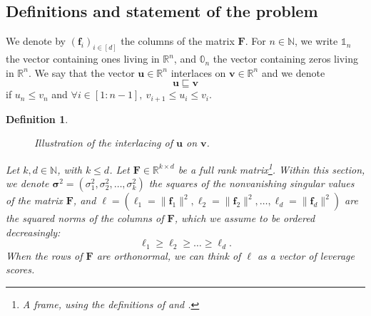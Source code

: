 \documentclass[twoside,11pt]{book}
\newtheorem{definition}{Definition}
\numberwithin{theorem}{chapter}
\numberwithin{definition}{chapter}
\numberwithin{proposition}{chapter}
\numberwithin{corollary}{chapter}
\numberwithin{example}{chapter}
\numberwithin{lemma}{chapter}
\numberwithin{assumption}{chapter}
\DeclareMathOperator{\Tran}{\intercal}
\begin{document}
\subsection{Definitions and statement of the problem}
 We denote by $(\bm{f}_{i})_{i \in [d]}$ the columns of the matrix $\bm{F}$. For $n \in \mathbb{N}$, we write $\mathbb{1}_{n}$ the vector containing ones living in $\mathbb{R}^{n}$, and $\mathbb{0}_{n}$ the vector containing zeros living in $\mathbb{R}^{n}$. We say that the vector $\bm{u} \in \mathbb{R}^{n}$ interlaces on $\bm{v} \in \mathbb{R}^{n}$ and we denote $$\bm{u} \sqsubseteq \bm{v}$$
if $u_{n} \leq v_{n}$ and $\forall i \in [1:n-1], \: v_{i+1} \leq u_{i} \leq v_{i}$.
\begin{definition}

\begin{figure}[!ht]
    \centering
    
    \caption{Illustration of the interlacing of $\bm{u}$ on $\bm{v}$.}
    \label{f:Interlacing_eigenvalues}
\end{figure}

Let $k, d \in \mathbb{N}$, with $k \leq d$. Let $\bm{F} \in \mathbb{R}^{k \times d}$ be a full rank matrix\footnote{A \emph{frame}, using the definitions of \citep{FiMiPo11} and \citep{FMPS13}.}.
Within this section, we denote $\bm{\sigma}^2 = (\sigma_{1}^2, \sigma_{2}^2, \dots ,\sigma_{k}^2)$ the squares of the nonvanishing singular values of the matrix $\bm{F}$, and $\bm{\ell} = (\ell_{1}=\|\bm{f}_{1}\|^{2}, \ell_{2}=\|\bm{f}_{2}\|^{2}, \dots, \ell_{d}=\|\bm{f}_{d}\|^{2})$ are the squared norms of the columns of $\bm{F}$, which we assume to be ordered decreasingly:
$$\ell_{1} \geq \ell_{2} \geq \dots \geq \ell_{d}.$$
 When the rows of $\bm{F}$ are orthonormal, we can think of $\bm{\ell}$ as a vector of leverage scores.
\end{definition}
\end{document}
